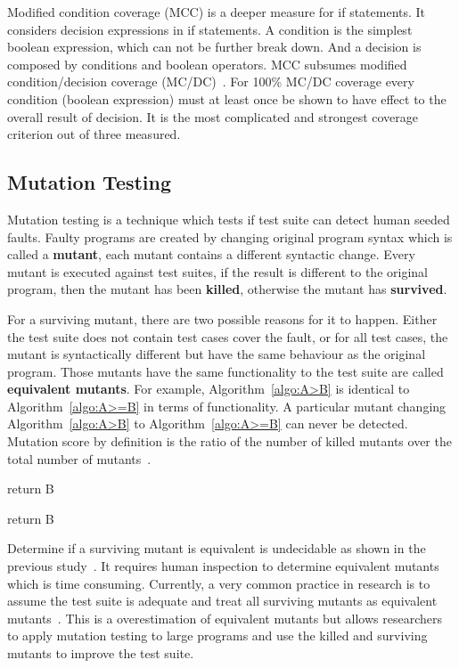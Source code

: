Modified condition coverage (MCC) is a deeper measure for if statements. It considers decision expressions in if statements. A condition is the simplest boolean expression, which can not be further break down. And a decision is composed by conditions and boolean operators. MCC subsumes modified condition/decision coverage (MC/DC)~\cite{hayhurst2001practical}. For 100\% MC/DC coverage every condition (boolean expression) must at least once be shown to have effect to the overall result of decision. It is the most complicated and strongest coverage criterion out of three measured.

\subsection{Mutation Testing}
Mutation testing is a technique which tests if test suite can detect human seeded faults. Faulty programs are created by changing original program syntax which is called a \textbf{mutant}, each mutant contains a different syntactic change. Every mutant is executed against test suites, if the result is different to the original program, then the mutant has been \textbf{killed}, otherwise the mutant has \textbf{survived}.

For a surviving mutant, there are two possible reasons for it to happen. Either the test suite does not contain test cases cover the fault, or for all test cases, the mutant is syntactically different but have the same behaviour as the original program. Those mutants have the same functionality to the test suite are called \textbf{equivalent mutants}. For example, Algorithm~\ref{algo:A>B} is identical to Algorithm~\ref{algo:A>=B} in terms of functionality. A particular mutant changing Algorithm~\ref{algo:A>B} to Algorithm~\ref{algo:A>=B} can never be detected. Mutation score by definition is the ratio of the number of killed mutants over the total number of mutants~\cite{jia2011analysis}. 

\begin{algorithm}[t]
	{return B\;
	}
	\caption{Return the number with highest value}
	\label{algo:A>B}
	\bigskip
\end{algorithm}

\begin{algorithm}[t]
	{
		return B\;
	}
	\caption{Return the number with highest value}
	\label{algo:A>=B}
	\bigskip
\end{algorithm}

Determine if a surviving mutant is equivalent is undecidable as shown in the previous study~\cite{budd1982two}. It requires human inspection to determine equivalent mutants which is time consuming. Currently, a very common practice in research is to assume the test suite is adequate and treat all surviving mutants as equivalent mutants~\cite{jia2011analysis}. This is a overestimation of equivalent mutants but allows researchers to apply mutation testing to large programs and use the killed and surviving mutants to improve the test suite.